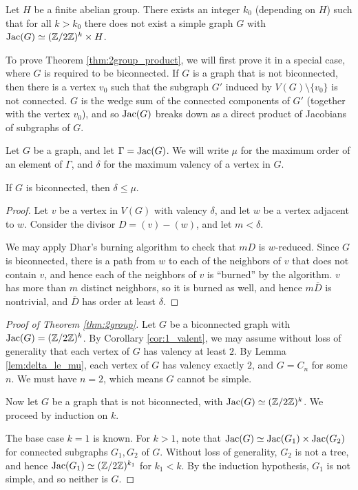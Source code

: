 \documentclass{amsart}
\begin{document}
\begin{thm}
  \label{thm:2group_product}
  Let $H$ be a finite abelian group. There exists an integer $k_0$
  (depending on $H$) such that for all $k > k_0$ there does not exist
  a simple graph $G$ with $\operatorname{Jac}(G) \simeq (\mathbb{Z}/2\mathbb{Z})^k \times H$.
\end{thm}

To prove Theorem \ref{thm:2group_product}, we will first prove it in a
special case, where $G$ is required to be biconnected. If $G$ is a
graph that is not biconnected, then there is a vertex $v_0$ such that
the subgraph $G'$ induced by $V(G) \setminus \{v_0\}$ is not
connected. $G$ is the wedge sum of the connected components of $G'$
(together with the vertex $v_0$), and so $\operatorname{Jac}(G)$ breaks down as a
direct product of Jacobians of subgraphs of $G$.

\begin{defn}
  Let $G$ be a graph, and let $\Gamma = \operatorname{Jac}(G)$. We will write $\mu$
  for the maximum order of an element of $\Gamma$, and $\delta$ for
  the maximum valency of a vertex in $G$.
\end{defn}

\begin{lem}
  \label{lem:delta_le_mu}
  If $G$ is biconnected, then $\delta \le \mu$.
\end{lem}
\begin{proof}
  Let $v$ be a vertex in $V(G)$ with valency $\delta$, and let $w$ be
  a vertex adjacent to $w$. Consider the divisor $D = (v) -
  (w)$, and let $m < \delta$. 

  We may apply Dhar's burning algorithm to check that $mD$ is
  $w$-reduced. Since $G$ is biconnected, there is a path from $w$ to
  each of the neighbors of $v$ that does not contain $v$, and hence
  each of the neighbors of $v$ is ``burned'' by the algorithm. $v$ has
  more than $m$ distinct neighbors, so it is burned as well, and hence
  $m\overline{D}$ is nontrivial, and $\overline{D}$ has order at
  least $\delta$.
\end{proof}

\begin{proof}[Proof of Theorem \ref{thm:2group}]
  Let $G$ be a biconnected graph with $\operatorname{Jac}(G) = (\mathbb{Z}/2\mathbb{Z})^k$. By
  Corollary \ref{cor:1_valent}, we may assume without loss of
  generality that each vertex of $G$ has valency at least $2$. By
  Lemma \ref{lem:delta_le_mu}, each vertex of $G$ has valency exactly
  $2$, and $G = C_n$ for some $n$. We must have $n=2$, which means $G$
  cannot be simple.

  Now let $G$ be a graph that is not biconnected, with $\operatorname{Jac}(G) \simeq
  (\mathbb{Z}/2\mathbb{Z})^k$. We proceed by induction on $k$.
  
  The base case $k=1$ is known. For $k > 1$, note that $\operatorname{Jac}(G) \simeq
  \operatorname{Jac}(G_1) \times \operatorname{Jac}(G_2)$ for connected subgraphs $G_1, G_2$ of
  $G$. Without loss of generality, $G_2$ is not a tree, and
  hence $\operatorname{Jac}(G_1) \simeq (\mathbb{Z}/2\mathbb{Z})^{k_1}$ for $k_1 < k$. By the
  induction hypothesis, $G_1$ is not simple, and so neither is $G$.
\end{proof}
\end{document}
